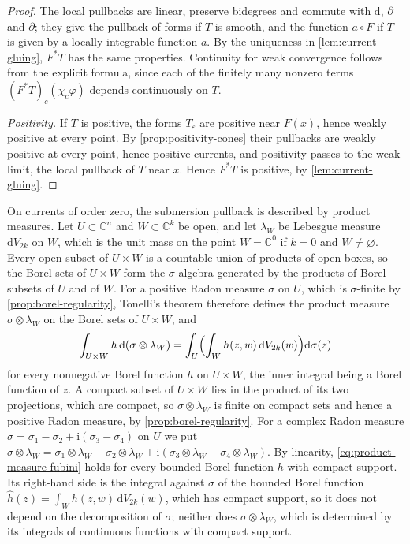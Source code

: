 \begin{proof}
The local pullbacks are linear, preserve bidegrees and commute with $\mathrm d$, $\partial$ and $\bar\partial$; they give the pullback of forms if $T$ is smooth, and the function $a\circ F$ if $T$ is given by a locally integrable function $a$. By the uniqueness in \cref{lem:current-gluing}, $F^*T$ has the same properties. Continuity for weak convergence follows from the explicit formula, since each of the finitely many nonzero terms $(F^*T)_c(\chi_c\varphi)$ depends continuously on $T$.

\emph{Positivity.} If $T$ is positive, the forms $T_\varepsilon$ are positive near $F(x)$, hence weakly positive at every point. By \cref{prop:positivity-cones} their pullbacks are weakly positive at every point, hence positive currents, and positivity passes to the weak limit, the local pullback of $T$ near $x$. Hence $F^*T$ is positive, by \cref{lem:current-gluing}.
\end{proof}

On currents of order zero, the submersion pullback is described by product measures. Let $U\subset\mathbb C^n$ and $W\subset\mathbb C^k$ be open, and let $\lambda_W$ be Lebesgue measure $\mathrm dV_{2k}$ on $W$, which is the unit mass on the point $W=\mathbb C^0$ if $k=0$ and $W\neq\varnothing$. Every open subset of $U\times W$ is a countable union of products of open boxes, so the Borel sets of $U\times W$ form the $\sigma$-algebra generated by the products of Borel subsets of $U$ and of $W$. For a positive Radon measure $\sigma$ on $U$, which is $\sigma$-finite by \cref{prop:borel-regularity}, Tonelli's theorem therefore defines the product measure $\sigma\otimes\lambda_W$ on the Borel sets of $U\times W$, and
\begin{equation}\label{eq:product-measure-fubini}
 \int_{U\times W}h\,\mathrm d(\sigma\otimes\lambda_W)=\int_U\Bigl(\int_Wh(z,w)\,\mathrm dV_{2k}(w)\Bigr)\mathrm d\sigma(z)
\end{equation}
for every nonnegative Borel function $h$ on $U\times W$, the inner integral being a Borel function of $z$. A compact subset of $U\times W$ lies in the product of its two projections, which are compact, so $\sigma\otimes\lambda_W$ is finite on compact sets and hence a positive Radon measure, by \cref{prop:borel-regularity}. For a complex Radon measure $\sigma=\sigma_1-\sigma_2+\mathrm i(\sigma_3-\sigma_4)$ on $U$ we put $\sigma\otimes\lambda_W=\sigma_1\otimes\lambda_W-\sigma_2\otimes\lambda_W+\mathrm i(\sigma_3\otimes\lambda_W-\sigma_4\otimes\lambda_W)$. By linearity, \eqref{eq:product-measure-fubini} holds for every bounded Borel function $h$ with compact support. Its right-hand side is the integral against $\sigma$ of the bounded Borel function $\widehat h(z)=\int_Wh(z,w)\,\mathrm dV_{2k}(w)$, which has compact support, so it does not depend on the decomposition of $\sigma$; neither does $\sigma\otimes\lambda_W$, which is determined by its integrals of continuous functions with compact support.

